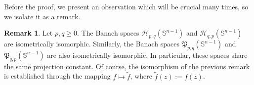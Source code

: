 \documentclass[12pt]{amsart}
\numberwithin{subsection}{section}
\theoremstyle{definition}
\newtheorem{remark}[theorem]{Remark}
\theoremstyle{remark}
\begin{document}
Before the proof, we present an observation which will be crucial many times, so we isolate it as a remark.

\begin{remark} \label{iso piola}
Let $ p, q \geq 0 $. The Banach spaces $ \mathcal{H}_{p,q}(\mathbb{S}^{n-1}) $ and $ \mathcal{H}_{q,p}(\mathbb{S}^{n-1}) $ are isometrically
isomorphic. Similarly, the Banach spaces $ \mathfrak{P}_{p,q}(\mathbb{S}^{n-1}) $ and $ \mathfrak{P}_{q,p}(\mathbb{S}^{n-1}) $ are also
isometrically isomorphic. In particular, these spaces share the same projection constant. Of course, the isomorphism of the previous remark is established through the mapping $ f \mapsto \tilde{f} $, where
$ \tilde{f}(z) := f(\overline{z})$.
\end{remark}
\end{document}
